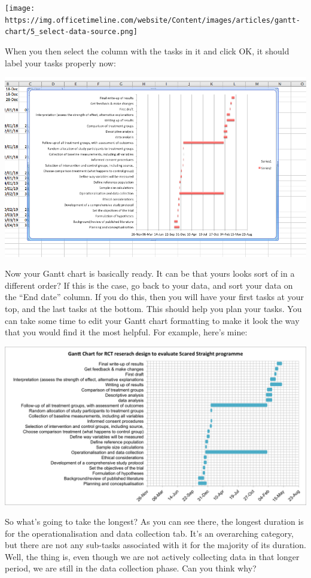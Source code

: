 \documentclass[
]{book}
\begin{document}
\texttt{[image: https://img.officetimeline.com/website/Content/images/articles/gantt-chart/5\_select-data-source.png]}

When you then select the column with the tasks in it and click OK, it should label your tasks properly now:

\includegraphics{imgs/gantt_labelled.png}

Now your Gantt chart is basically ready. It can be that yours looks sort of in a different order? If this is the case, go back to your data, and sort your data on the ``End date'' column. If you do this, then you will have your first tasks at your top, and the last tasks at the bottom. This should help you plan your tasks. You can take some time to edit your Gantt chart formatting to make it look the way that you would find it the most helpful. For example, here's mine:

\includegraphics{imgs/final_gantt.png}

So what's going to take the longest? As you can see there, the longest duration is for the operationalisation and data collection tab. It's an overarching category, but there are not any sub-tasks associated with it for the majority of its duration. Well, the thing is, even though we are not actively collecting data in that longer period, we are still in the data collection phase. Can you think why?
\end{document}

